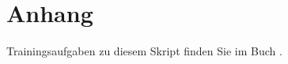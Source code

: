
\newpage
\appendix

\section{Anhang}


\newpage



\newpage

Trainingsaufgaben zu diesem Skript finden Sie im Buch
.
